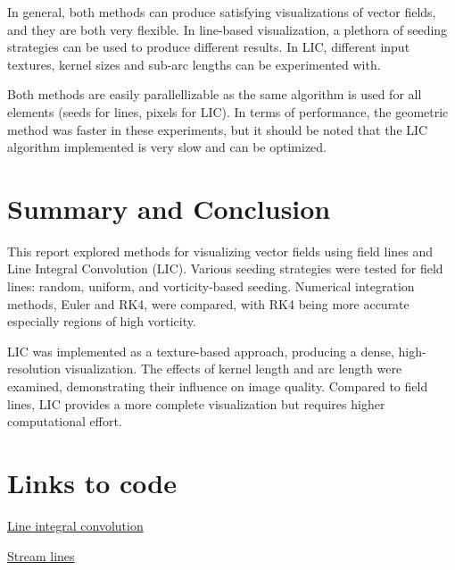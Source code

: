 \documentclass{article}
\begin{document}
In general, both methods can produce satisfying visualizations of vector fields, and they are
both very flexible. In line-based visualization, a plethora of seeding strategies can be used to produce different results.
In LIC, different input textures, kernel sizes and sub-arc lengths can be experimented with.

Both methods are easily parallellizable as the same algorithm is used for all elements (seeds for lines, pixels for LIC). In terms of performance, the geometric method
was faster in these experiments, but it should be noted that the LIC algorithm implemented is very slow and can be optimized.

\section{Summary and Conclusion}
This report explored methods for visualizing vector fields using field lines and Line Integral Convolution (LIC). Various seeding strategies were tested for field lines: random, uniform, and vorticity-based seeding. Numerical integration methods, Euler and RK4, were compared, with RK4 being more accurate especially regions of high vorticity.

LIC was implemented as a texture-based approach, producing a dense, high-resolution visualization. The effects of kernel length and arc length were examined, demonstrating their influence on image quality. Compared to field lines, LIC provides a more complete visualization but requires higher computational effort.


\section*{Links to code}
\href{https://github.com/edvartGB/visualization/blob/main/oblig/lic_vectorized.ipynb}{Line integral convolution}

\noindent \href{https://github.com/edvartGB/visualization/blob/main/oblig/oblig.ipynb}{Stream lines}
\end{document}
